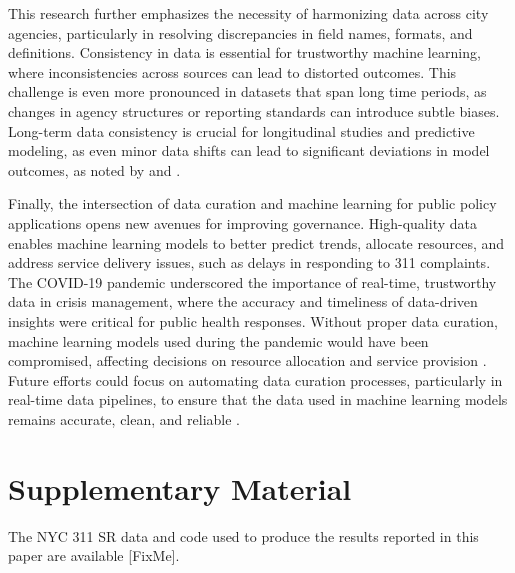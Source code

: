 \documentclass[linenumber]{jdsart}
\begin{document}
This research further emphasizes the necessity of harmonizing data
across city agencies, particularly in resolving discrepancies in field
names, formats, and definitions. Consistency in data is essential for
trustworthy machine learning, where inconsistencies across sources can
lead to distorted outcomes. This challenge is even more pronounced in
datasets that span long time periods, as changes in agency structures
or reporting standards can introduce subtle biases. Long-term data
consistency is crucial for longitudinal studies and predictive
modeling, as even minor data shifts can lead to significant deviations
in model outcomes, as noted by \citet{rahm2000data} and
\citet{borgman2012conundrum}.


Finally, the intersection of data curation and machine learning for
public policy applications opens new avenues for improving governance.
High-quality data enables machine learning models to better predict
trends, allocate resources, and address service delivery issues, such
as delays in responding to 311 complaints. The COVID-19 pandemic
underscored the importance of real-time, trustworthy data in crisis
management, where the accuracy and timeliness of data-driven insights
were critical for public health responses. Without proper data
curation, machine learning models used during the pandemic would have
been compromised, affecting decisions on resource allocation and
service provision \citep{worby2020face, khemasuwan2021applications}.
Future efforts could focus on automating data curation processes,
particularly in real-time data pipelines, to ensure that the data used
in machine learning models remains accurate, clean, and reliable
\citep{chu2016data, hurbean2021open}.


\section*{Supplementary Material}
The NYC 311 SR data and code used to produce the results reported in
this paper are available [FixMe].




\end{document}
